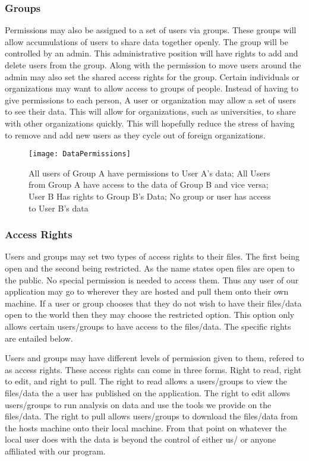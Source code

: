 \subsubsection{Groups}
Permissions may also be assigned to a set of users via groups. These groups will allow accumulations of users to share data together openly. The group will be controlled by an admin. This administrative position will have rights to add and delete users from the group. Along with the permission to move users around the admin may also set the shared access rights for the group. Certain individuals or organizations may want to allow access to groups of people. Instead of having to give permissions to each person, A user or organization may allow a set of users to see their data. This will allow for organizations, such as universities, to share with other organizations quickly. This will hopefully reduce the stress of having to remove and add new users as they cycle out of foreign organizations.

\begin{figure}[t]
  \begin{center}
  \captionsetup{width=.8\linewidth}
  \texttt{[image: DataPermissions]}
  \caption{All users of Group A have permissions to User A's data; All Users from Group A have access to the data of Group B and vice versa; User B Has rights to Group B's Data; No group or user has access to User B's data}
  \end{center}
\end{figure}

\subsubsection{Access Rights}
Users and groups may set two types of access rights to their files. The first being open and the second being restricted. As the name states open files are open to the public. No special permission is needed to access them. Thus any user of our application may go to wherever they are hosted and pull them onto their own machine. If a user or group chooses that they do not wish to have their files/data open to the world then they may choose the restricted option. This option only allows certain users/groups to have access to the files/data. The specific rights are entailed below.\par
Users and groups may have different levels of permission given to them, refered to as access rights. These access rights can come in three forms. Right to read, right to edit, and right to pull. The right to read allows a users/groups to view the files/data the a user has published on the application. The right to edit allows users/groups to run analysis on data and use the tools we provide on the files/data. The right to pull allows users/groups to download the files/data from the hosts machine onto their local machine. From that point on whatever the local user does with the data is beyond the control of either us/ or anyone affiliated with our program.
